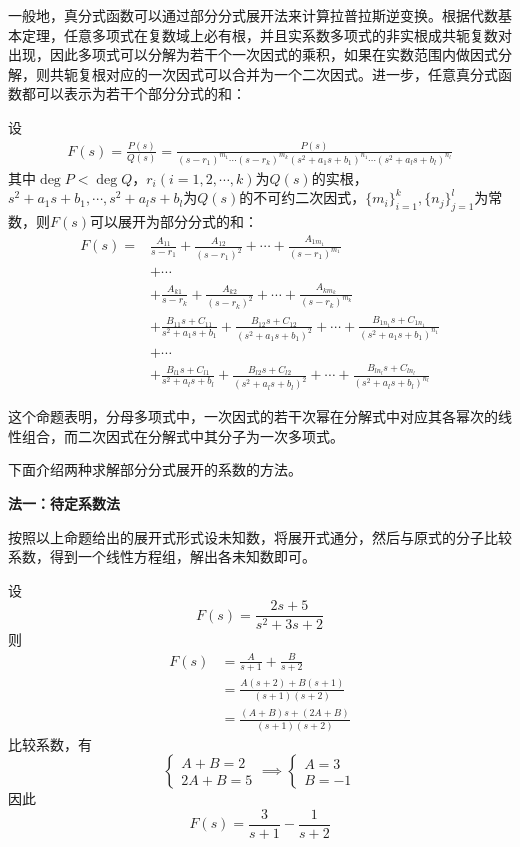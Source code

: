 一般地，真分式函数可以通过部分分式展开法来计算拉普拉斯逆变换。根据代数基本定理，任意多项式在复数域上必有根，并且实系数多项式的非实根成共轭复数对出现，因此多项式可以分解为若干个一次因式的乘积，如果在实数范围内做因式分解，则共轭复根对应的一次因式可以合并为一个二次因式。进一步，任意真分式函数都可以表示为若干个部分分式的和\cite{zorich}\cite{xinjiang}：
\begin{theorem}[部分分式展开定理]
    设\begin{align*}
    F(s)=\frac{P(s)}{Q(s)}=\frac{P(s)}{(s-r_1)^{m_1}\cdots (s-r_k)^{m_k}(s^2+a_1 s+b_1)^{n_1}\cdots (s^2+a_l s+b_l)^{n_l}}
    \end{align*}
其中$\deg P<\deg Q$，$r_i(i=1,2,\cdots,k)$为$Q(s)$的实根，$s^2+a_1 s+b_1,\cdots,s^2+a_l s+b_l$为$Q(s)$的不可约二次因式，$\{m_i\}_{i=1}^k,\{n_j\}_{j=1}^l$为常数，则$F(s)$可以展开为部分分式的和：
\begin{align*}
    F(s)=&\frac{A_{11}}{s-r_1}+\frac{A_{12}}{(s-r_1)^2}+\cdots +\frac{A_{1m_1}}{(s-r_1)^{m_1}}\\
    &+\cdots \\
    &+\frac{A_{k1}}{s-r_k}+\frac{A_{k2}}{(s-r_k)^2}+\cdots +\frac{A_{km_k}}{(s-r_k)^{m_k}}\\
    &+\frac{B_{11}s+C_{11}}{s^2+a_1 s+b_1}+\frac{B_{12}s+C_{12}}{(s^2+a_1 s+b_1)^2}+\cdots +\frac{B_{1n_1}s+C_{1n_1}}{(s^2+a_1 s+b_1)^{n_1}}\\
    &+\cdots \\
    &+\frac{B_{l1}s+C_{l1}}{s^2+a_l s+b_l}+\frac{B_{l2}s+C_{l2}}{(s^2+a_l s+b_l)^2}+\cdots +\frac{B_{ln_l}s+C_{ln_l}}{(s^2+a_l s+b_l)^{n_l}}
\end{align*}
\end{theorem}
这个命题表明，分母多项式中，一次因式的若干次幂在分解式中对应其各幂次的线性组合，而二次因式在分解式中其分子为一次多项式。

下面介绍两种求解部分分式展开的系数的方法。

\noindent \textbf{法一：待定系数法}

按照以上命题给出的展开式形式设未知数，将展开式通分，然后与原式的分子比较系数，得到一个线性方程组，解出各未知数即可。
\begin{example}
    设\[F(s)=\frac{2s+5}{s^2+3s+2}\]
    则
    \begin{align*}
        F(s)&=\frac{A}{s+1}+\frac{B}{s+2}\\
        &=\frac{A(s+2)+B(s+1)}{(s+1)(s+2)}\\
        &=\frac{(A+B)s+(2A+B)}{(s+1)(s+2)}
    \end{align*}
    比较系数，有
    \[\begin{cases}
        A+B=2\\
        2A+B=5
    \end{cases}\implies \begin{cases}
        A=3\\
        B=-1
    \end{cases}\]
    因此\[F(s)=\frac{3}{s+1}-\frac{1}{s+2}\]
\end{example}

